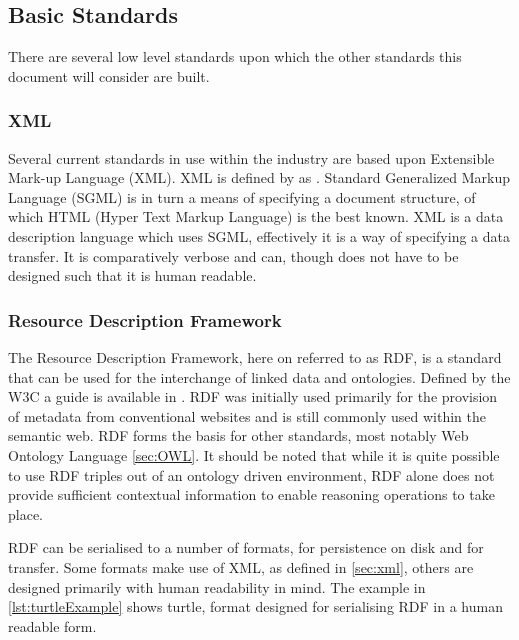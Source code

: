 \subsection{Basic Standards}
There are several low level standards upon which the other standards this document will consider are built.

\subsubsection{XML}
\label{sec:xml}
Several current standards in use within the industry are based upon Extensible Mark-up Language (XML). XML is defined by \citet{W3.org2013} as . Standard Generalized Markup Language (SGML) is in turn a means of specifying a document structure, of which HTML (Hyper Text Markup Language) is the best known. XML is a data description language which uses SGML, effectively it is a way of specifying a data transfer. It is comparatively verbose and can, though does not have to be designed such that it is human readable.  

\subsubsection{Resource Description Framework}
The Resource Description Framework, here on referred to as RDF, is a standard that can be used for the interchange of linked data and ontologies. Defined by the W3C a guide is available in \citet{Wood14}. RDF was initially used primarily for the provision of metadata from conventional websites and is still commonly used within the semantic web. RDF forms the basis for other standards, most notably Web Ontology Language \autoref{sec:OWL}. It should be noted that while it is quite possible to use RDF triples out of an ontology driven environment, RDF alone does not provide sufficient contextual information to enable reasoning operations to take place.

RDF can be serialised to a number of formats, for persistence on disk and for transfer. Some formats make use of XML, as defined in \autoref{sec:xml}, others are designed primarily with human readability in mind. The example in \autoref{lst:turtleExample} shows turtle, format designed for serialising RDF in a human readable form.

